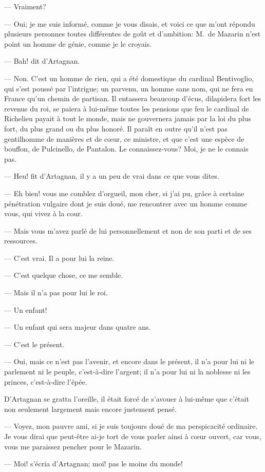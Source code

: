 — Vraiment?

— Oui; je me suis informé, comme je vous disais, et voici ce que m'ont répondu plusieurs personnes toutes différentes de goût et d'ambition: M.~de Mazarin n'est point un homme de génie, comme je le croyais.

— Bah! dit d'Artagnan.

— Non. C'est un homme de rien, qui a été domestique du cardinal Bentivoglio, qui s'est poussé par l'intrigue; un parvenu, un homme sans nom, qui ne fera en France qu'un chemin de partisan. Il entassera beaucoup d'écus, dilapidera fort les revenus du roi, se paiera à lui-même toutes les pensions que feu le cardinal de Richelieu payait à tout le monde, mais ne gouvernera jamais par la loi du plus fort, du plus grand ou du plus honoré. Il paraît en outre qu'il n'est pas gentilhomme de manières et de cœur, ce ministre, et que c'est une espèce de bouffon, de Pulcinello, de Pantalon. Le connaissez-vous? Moi, je ne le connais pas.

— Heu! fit d'Artagnan, il y a un peu de vrai dans ce que vous dites.

— Eh bien! vous me comblez d'orgueil, mon cher, si j'ai pu, grâce à certaine pénétration vulgaire dont je suis doué, me rencontrer avec un homme comme vous, qui vivez à la cour.

— Mais vous m'avez parlé de lui personnellement et non de son parti et de ses ressources.

— C'est vrai. Il a pour lui la reine.

— C'est quelque chose, ce me semble.

— Mais il n'a pas pour lui le roi.

— Un enfant!

— Un enfant qui sera majeur dans quatre ans.

— C'est le présent.

— Oui, mais ce n'est pas l'avenir, et encore dans le présent, il n'a pour lui ni le parlement ni le peuple, c'est-à-dire l'argent; il n'a pour lui ni la noblesse ni les princes, c'est-à-dire l'épée.

D'Artagnan se gratta l'oreille, il était forcé de s'avouer à lui-même que c'était non seulement largement mais encore justement pensé.

— Voyez, mon pauvre ami, si je suis toujours doué de ma perspicacité ordinaire. Je vous dirai que peut-être ai-je tort de vous parler ainsi à cœur ouvert, car vous, vous me paraissez pencher pour le Mazarin.

— Moi! s'écria d'Artagnan; moi! pas le moins du monde!

